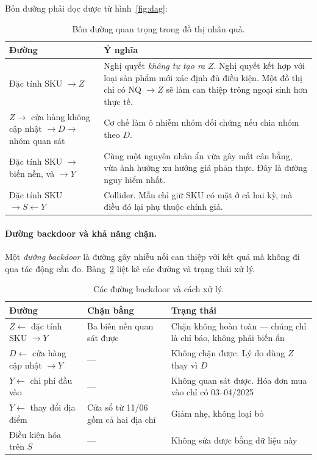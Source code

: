 \documentclass[11pt]{article}
\begin{document}
Bốn đường phải đọc được từ hình~\ref{fig:dag}:

\begin{table}[htbp]
  \centering
  \caption{Bốn đường quan trọng trong đồ thị nhân quả.}
  \label{tab:bon-duong}
  \begin{tabular}{p{5.4cm}p{8.6cm}}
    \toprule
    Đường & Ý nghĩa \\
    \midrule
    Đặc tính SKU $\to Z$
    & Nghị quyết \emph{không tự tạo ra} $Z$. Nghị quyết kết hợp với loại sản phẩm mới xác định đủ
      điều kiện. Một đồ thị chỉ có NQ $\to Z$ sẽ làm can thiệp trông ngoại sinh hơn thực tế. \\
    \addlinespace
    $Z \to$ cửa hàng không cập nhật $\to D \to$ nhóm quan sát
    & Cơ chế làm ô nhiễm nhóm đối chứng nếu chia nhóm theo $D$. \\
    \addlinespace
    Đặc tính SKU $\to$ biến nền, và $\to Y$
    & Cùng một nguyên nhân ẩn vừa gây mất cân bằng, vừa ảnh hưởng xu hướng giá phản thực. Đây là
      đường nguy hiểm nhất. \\
    \addlinespace
    Đặc tính SKU $\to S \leftarrow Y$
    & Collider. Mẫu chỉ giữ SKU có mặt ở cả hai kỳ, mà điều đó lại phụ thuộc chính giá. \\
    \bottomrule
  \end{tabular}
\end{table}

\paragraph{Đường backdoor và khả năng chặn.} Một \emph{đường backdoor} là đường gây nhiễu nối can
thiệp với kết quả mà không đi qua tác động cần đo. Bảng~\ref{tab:backdoor} liệt kê các đường và
trạng thái xử lý.

\begin{table}[htbp]
  \centering
  \caption{Các đường backdoor và cách xử lý.}
  \label{tab:backdoor}
  \begin{tabular}{p{4.6cm}p{4.2cm}p{5.2cm}}
    \toprule
    Đường & Chặn bằng & Trạng thái \\
    \midrule
    $Z \leftarrow$ đặc tính SKU $\to Y$ & Ba biến nền quan sát được
    & Chặn không hoàn toàn --- chúng chỉ là chỉ báo, không phải biến ẩn \\
    \addlinespace
    $D \leftarrow$ cửa hàng cập nhật $\to Y$ & ---
    & Không chặn được. Lý do dùng $Z$ thay vì $D$ \\
    \addlinespace
    $Y \leftarrow$ chi phí đầu vào & ---
    & Không quan sát được. Hóa đơn mua vào chỉ có 03--04/2025 \\
    \addlinespace
    $Y \leftarrow$ thay đổi địa điểm & Cửa sổ từ 11/06 gồm cả hai địa chỉ
    & Giảm nhẹ, không loại bỏ \\
    \addlinespace
    Điều kiện hóa trên $S$ & ---
    & Không sửa được bằng dữ liệu này \\
    \bottomrule
  \end{tabular}
\end{table}
\end{document}
